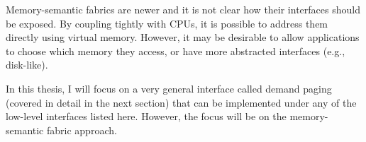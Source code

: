 Memory-semantic fabrics are newer and it is not clear how their interfaces
should be exposed. By coupling tightly with CPUs, it is possible to address
them directly using virtual memory. However, it may be desirable to allow
applications to choose which memory they access, or have more abstracted
interfaces (e.g., disk-like).

In this thesis, I will focus on a very general interface called demand paging
(covered in detail in the next section) that can be implemented under any of
the low-level interfaces listed here. However, the focus will be on the
memory-semantic fabric approach.

